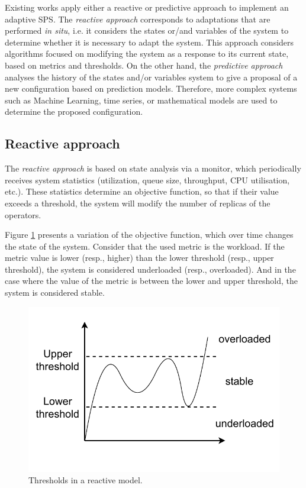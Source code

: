 Existing works apply either a reactive or predictive approach to implement an adaptive SPS. The \textit{reactive approach} corresponds to adaptations that are performed \textit{in situ}, i.e. it considers the states or/and variables of the system to determine whether it is necessary to adapt the system. This approach considers algorithms focused on modifying the system as a response to its current state, based on metrics and thresholds. On the other hand, the \textit{predictive approach} analyses the history of the states and/or variables system to give a proposal of a new configuration based on prediction models. Therefore, more complex systems such as Machine Learning, time series, or mathematical models are used to determine the proposed configuration.

\subsection{Reactive approach}
\label{rw-auto-reactive}
The \textit{reactive approach} is based on state analysis via a monitor, which periodically receives system statistics (utilization, queue size, throughput, CPU utilisation, etc.). These statistics determine an objective function, so that if their value exceeds a threshold, the system will modify the number of replicas of the operators.

Figure \ref{fig:rw-reactive-threshold} presents a variation of the objective function, which over time changes the state of the system. Consider that the used metric is the workload. If the metric value is lower (resp., higher) than the lower threshold (resp., upper threshold), the system is considered underloaded (resp., overloaded). And in the case where the value of the metric is between the lower and upper threshold, the system is considered stable.

\begin{figure}[!ht]
	\centering
	\includegraphics[scale=0.75]{figures/concepts/RW-Reactive-Threshold.pdf}
	\caption{Thresholds in a reactive model.}
	\label{fig:rw-reactive-threshold}
\end{figure}

